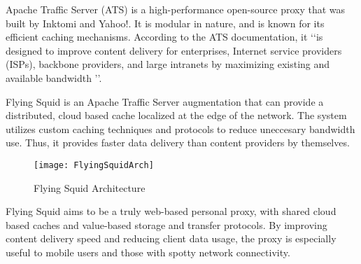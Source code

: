 Apache Traffic Server (ATS) is a high-performance open-source proxy that was built by Inktomi and Yahoo!. It is modular in nature, and is known for its efficient caching mechanisms. According to the ATS documentation, it \lq \lq is designed to improve content delivery for enterprises, Internet service providers (ISPs), backbone providers, and large intranets by maximizing existing and available bandwidth \rq \rq \cite{ATS}.

Flying Squid is an Apache Traffic Server augmentation that can provide a distributed, cloud based cache localized at the edge of the network. The system utilizes custom caching techniques and protocols to reduce uneccesary bandwidth use. Thus, it provides faster data delivery than content providers by themselves. 

\begin{figure}[H] \centering
\texttt{[image: FlyingSquidArch]}
\caption{Flying Squid Architecture}
\end{figure}


Flying Squid aims to be a truly web-based personal proxy, with shared cloud based caches and value-based storage and transfer protocols. By improving content delivery speed and reducing client data usage, the proxy is especially useful to mobile users and those with spotty network connectivity.